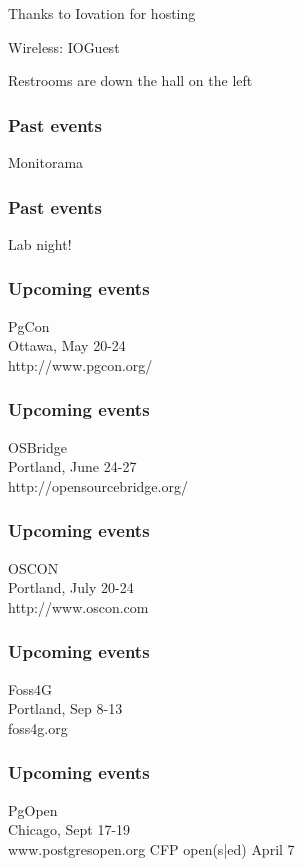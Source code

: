 \documentclass{beamer}
\begin{document}

\frame
{
  \begin{center}
  \item[]Thanks to Iovation for hosting
  \item[]Wireless: IOGuest
  \item[]Restrooms are down the hall on the left
  \end{center}
}

\frame
{
  \frametitle{Past events}
  \begin{center}
{\large Monitorama\\}
  \end{center}
}
\frame
{
  \frametitle{Past events}
  \begin{center}
{\large Lab night!\\}
  \end{center}
}

\frame
{
  \frametitle{Upcoming events}
  \begin{center}
{\large PgCon\\}
Ottawa, May 20-24\\
http://www.pgcon.org/
  \end{center}
}
\frame
{
  \frametitle{Upcoming events}
  \begin{center}
{\large OSBridge\\}
Portland, June 24-27\\
http://opensourcebridge.org/
  \end{center}
}

\frame
{
  \frametitle{Upcoming events}
  \begin{center}
{\large OSCON\\}
Portland, July 20-24\\
http://www.oscon.com
  \end{center}
}

\frame
{
  \frametitle{Upcoming events}
  \begin{center}
{\large Foss4G\\}
Portland, Sep 8-13\\
foss4g.org
  \end{center}
}

\frame
{
  \frametitle{Upcoming events}
  \begin{center}
{\large PgOpen\\}
Chicago, Sept 17-19\\
www.postgresopen.org
CFP open(s|ed) April 7
  \end{center}
}
\end{document}
